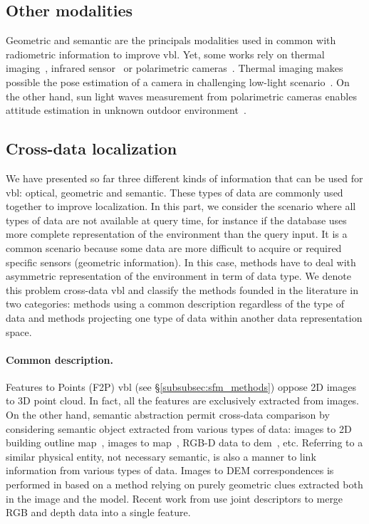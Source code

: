 	\subsection{Other modalities}
	\label{subsec:other_modalities}
	
	Geometric and semantic are the principals modalities used in common with radiometric information to improve \ac{vbl}. Yet, some works rely on thermal imaging~\citep{Lu2016}, infrared sensor~\citep{Bonardi2017} or polarimetric cameras~\citep{Rastgoo2018}. Thermal imaging makes possible the pose estimation of a camera in challenging low-light scenario~\citep{Lu2016}. On the other hand, sun light waves measurement from polarimetric cameras enables attitude estimation in unknown outdoor environment~\citep{Rastgoo2018}.
				
	\subsection{Cross-data localization}
	\label{subsec:cross_data}        
		We have presented so far three different kinds of information that can be used for \ac{vbl}: optical, geometric and semantic. These types of data are commonly used together to improve localization. In this part, we consider the scenario where all types of data are not available at query time, for instance if the database uses more complete representation of the environment than the query input. It is a common scenario because some data are more difficult to acquire or required specific sensors (\eg geometric information). In this case, methods have to deal with asymmetric representation of the environment in term of data type. We denote this problem cross-data \ac{vbl} and classify the methods founded in the literature in two categories: methods using a common description regardless of the type of data and methods projecting one type of data within another data representation space.
		
    	\paragraph{Common description.}
    		Features to Points (F2P) \ac{vbl} (see \S\ref{subsubsec:sfm_methods}) oppose 2D images to 3D point cloud. In fact, all the features are exclusively extracted from images. On the other hand, semantic abstraction permit cross-data comparison by considering semantic object extracted from various types of data: images to 2D building outline map~\citep{Cham2010}, images to map~\citep{Ardeshir2014,Qu2015,Castaldo2015,Brubaker2016}, RGB-D data to \ac{dem}~\citep{Christie2016}, etc. Referring to a similar physical entity, not necessary semantic, is also a manner to link information from various types of data. Images to DEM correspondences is performed in \citep{Bansal2014} based on a method relying on purely geometric clues extracted both in the image and the model. Recent work from \citep{Sizikova2016,Li2017} use joint descriptors to merge RGB and depth data into a single feature.
					
